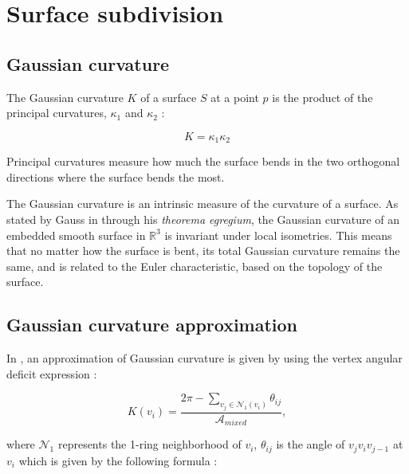 \documentclass[11pt,fleqn]{book} %
\begin{document}
\section{Surface subdivision}
\label{sec:surface_subdivision}





\printindex

\begin{appendices}
\section{Gaussian curvature}
\label{sec:gaussian_curvature}
The Gaussian curvature $K$ of a surface $S$ at a point $p$ is the product of the principal curvatures, $\kappa_1$ and $\kappa_2$ :

\begin{equation}
	K = \kappa_1\kappa_2
\end{equation}

Principal curvatures measure how much the surface bends in the two orthogonal directions where the surface bends the most.

The Gaussian curvature is an intrinsic measure of the curvature of a surface. 
As stated by Gauss in \cite{Gau28} through his \textit{theorema egregium}, the Gaussian curvature of an embedded smooth surface in $\mathbb{R}^3$ is invariant under local isometries.
This means that no matter how the surface is bent, its total Gaussian curvature remains the same, and is related to the Euler characteristic, based on the topology of the surface.

\subsection{Gaussian curvature approximation}
In \cite{MMPB02}, an approximation of Gaussian curvature is given by using the vertex angular deficit expression :

\begin{equation}
	K(v_i) = \frac{2\pi -\sum_{v_j \in \mathcal{N}_1(v_i)} \theta_{ij}}{\mathcal{A}_{mixed}},
\end{equation}

where $\mathcal{N}_1$ represents the 1-ring neighborhood of $v_i$, $\theta_{ij}$ is the angle of $v_jv_iv_{j-1}$ at $v_i$ which is given by the following formula : 


\end{appendices}
\end{document}
